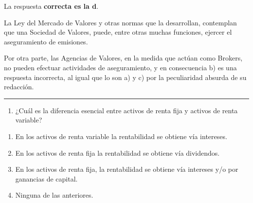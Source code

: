 \documentclass[
  letterpaper,
  DIV=11,
  numbers=noendperiod]{scrreprt}
\providecommand{\tightlist}{%
  \setlength{\itemsep}{0pt}\setlength{\parskip}{0pt}}\usepackage{longtable,booktabs,array}
\begin{document}
\begin{tcolorbox}[enhanced jigsaw, left=2mm, opacityback=0, colback=white, breakable, arc=.35mm, bottomrule=.15mm, rightrule=.15mm, toprule=.15mm, leftrule=.75mm, colframe=quarto-callout-tip-color-frame]
\begin{minipage}[t]{5.5mm}
\textcolor{quarto-callout-tip-color}{\faLightbulb}
\end{minipage}%
\begin{minipage}[t]{\textwidth - 5.5mm}

La respuesta \textbf{correcta es la d}.

La Ley del Mercado de Valores y otras normas que la desarrollan,
contemplan que una Sociedad de Valores, puede, entre otras muchas
funciones, ejercer el aseguramiento de emisiones.

Por otra parte, las Agencias de Valores, en la medida que actúan como
Brokers, no pueden efectuar actividades de aseguramiento, y en
consecuencia b) es una respuesta incorrecta, al igual que lo son a) y c)
por la peculiaridad absurda de su redacción.

\end{minipage}%
\end{tcolorbox}

\begin{center}\rule{0.5\linewidth}{0.5pt}\end{center}

\begin{enumerate}
\def\labelenumi{\arabic{enumi}.}
\setcounter{enumi}{17}
\tightlist
\item
  ¿Cuál es la diferencia esencial entre activos de renta fija y activos
  de renta variable?
\end{enumerate}

\begin{enumerate}
\def\labelenumi{\alph{enumi})}
\item
  En los activos de renta variable la rentabilidad se obtiene vía
  intereses.
\item
  En los activos de renta fija la rentabilidad se obtiene vía
  dividendos.
\item
  En los activos de renta fija, la rentabilidad se obtiene vía intereses
  y/o por ganancias de capital.
\item
  Ninguna de las anteriores.
\end{enumerate}
\end{document}

